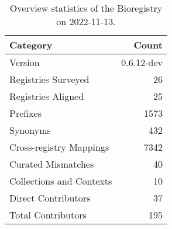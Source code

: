 \begin{table}
\centering
\caption{Overview statistics of the Bioregistry on 2022-11-13.}
\label{tab:bioregistry-summary}
\begin{tabular}{lr}
\toprule
                Category &      Count \\
\midrule
                 Version & 0.6.12-dev \\
     Registries Surveyed &         26 \\
      Registries Aligned &         25 \\
                Prefixes &       1573 \\
                Synonyms &        432 \\
 Cross-registry Mappings &       7342 \\
      Curated Mismatches &         40 \\
Collections and Contexts &         10 \\
     Direct Contributors &         37 \\
      Total Contributors &        195 \\
\bottomrule
\end{tabular}
\end{table}
